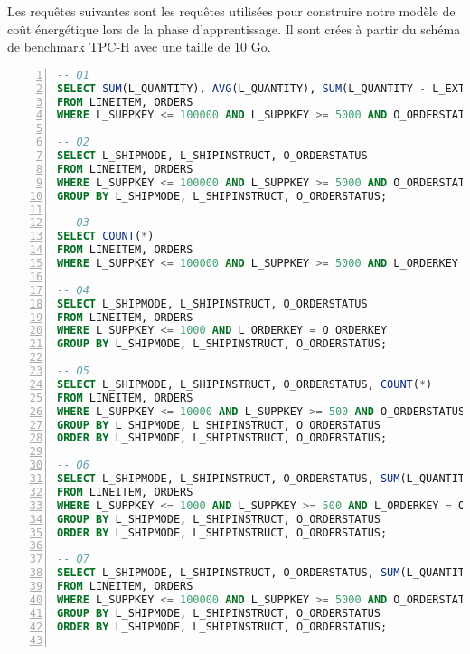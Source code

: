 \label{annex:TrainQueries}
Les requêtes suivantes sont les requêtes utilisées pour construire notre modèle de coût énergétique lors de la phase d'apprentissage. Il sont crées à partir du schéma de benchmark TPC-H \cite{TPCH} avec une taille de 10 Go.

\begin{lstlisting}[language=sql,numbers=left,xleftmargin=2em,multicols=2,basicstyle=\ttfamily\tiny]
-- Q1
SELECT SUM(L_QUANTITY), AVG(L_QUANTITY), SUM(L_QUANTITY - L_EXTENDEDPRICE), SUM(L_QUANTITY * L_EXTENDEDPRICE - 1), AVG(L_DISCOUNT * (L_TAX +1)), AVG(L_QUANTITY / (L_TAX +1)), SUM(L_TAX)/SUM(L_EXTENDEDPRICE), SUM(L_QUANTITY * 0.5), AVG(L_QUANTITY * 0.2), SUM(O_TOTALPRICE), AVG(O_SHIPPRIORITY), SUM(O_TOTALPRICE - L_EXTENDEDPRICE), AVG(O_SHIPPRIORITY * L_EXTENDEDPRICE - 1), SUM(O_SHIPPRIORITY)/SUM(O_TOTALPRICE), COUNT(*)
FROM LINEITEM, ORDERS
WHERE L_SUPPKEY <= 100000 AND L_SUPPKEY >= 5000 AND O_ORDERSTATUS = 'F' AND L_ORDERKEY = O_ORDERKEY;

-- Q2
SELECT L_SHIPMODE, L_SHIPINSTRUCT, O_ORDERSTATUS
FROM LINEITEM, ORDERS
WHERE L_SUPPKEY <= 100000 AND L_SUPPKEY >= 5000 AND O_ORDERSTATUS = 'F' AND L_ORDERKEY = O_ORDERKEY
GROUP BY L_SHIPMODE, L_SHIPINSTRUCT, O_ORDERSTATUS;

-- Q3
SELECT COUNT(*)
FROM LINEITEM, ORDERS
WHERE L_SUPPKEY <= 100000 AND L_SUPPKEY >= 5000 AND L_ORDERKEY = O_ORDERKEY;

-- Q4
SELECT L_SHIPMODE, L_SHIPINSTRUCT, O_ORDERSTATUS
FROM LINEITEM, ORDERS
WHERE L_SUPPKEY <= 1000 AND L_ORDERKEY = O_ORDERKEY
GROUP BY L_SHIPMODE, L_SHIPINSTRUCT, O_ORDERSTATUS;

-- Q5
SELECT L_SHIPMODE, L_SHIPINSTRUCT, O_ORDERSTATUS, COUNT(*)
FROM LINEITEM, ORDERS
WHERE L_SUPPKEY <= 10000 AND L_SUPPKEY >= 500 AND O_ORDERSTATUS = 'F' AND L_ORDERKEY = O_ORDERKEY
GROUP BY L_SHIPMODE, L_SHIPINSTRUCT, O_ORDERSTATUS
ORDER BY L_SHIPMODE, L_SHIPINSTRUCT, O_ORDERSTATUS;

-- Q6
SELECT L_SHIPMODE, L_SHIPINSTRUCT, O_ORDERSTATUS, SUM(L_QUANTITY), AVG(L_QUANTITY), SUM(O_TOTALPRICE), COUNT(*)
FROM LINEITEM, ORDERS
WHERE L_SUPPKEY <= 1000 AND L_SUPPKEY >= 500 AND L_ORDERKEY = O_ORDERKEY
GROUP BY L_SHIPMODE, L_SHIPINSTRUCT, O_ORDERSTATUS
ORDER BY L_SHIPMODE, L_SHIPINSTRUCT, O_ORDERSTATUS;

-- Q7
SELECT L_SHIPMODE, L_SHIPINSTRUCT, O_ORDERSTATUS, SUM(L_QUANTITY), AVG(L_QUANTITY), SUM(O_TOTALPRICE), COUNT(*)
FROM LINEITEM, ORDERS
WHERE L_SUPPKEY <= 100000 AND L_SUPPKEY >= 5000 AND O_ORDERSTATUS = 'F' AND L_ORDERKEY = O_ORDERKEY
GROUP BY L_SHIPMODE, L_SHIPINSTRUCT, O_ORDERSTATUS
ORDER BY L_SHIPMODE, L_SHIPINSTRUCT, O_ORDERSTATUS;


\end{lstlisting}
